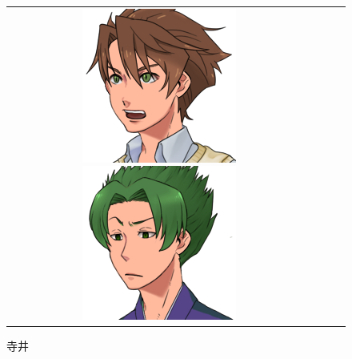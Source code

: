 \begin{figure}[b]
\begin{tabular}{cccc}
\begin{minipage}{0.2\textwidth}\includegraphics[width=\textwidth]{./jumpakuasset/F.png}\caption{恵夫}\label{fig:jumpakuF}\end{minipage}
\begin{minipage}{0.2\textwidth}\includegraphics[width=\textwidth]{./jumpakuasset/G.png}\caption{寺井}\label{fig:jumpakuG}\end{minipage}

\end{tabular}
\end{figure}
